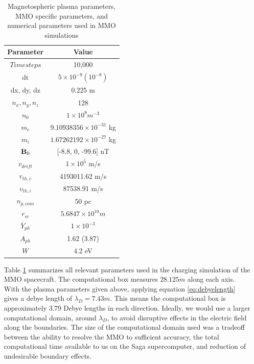 \begin{table}[H]
    \centering
    \begin{tabular}{c|c}
        \toprule
        \toprule
        Parameter & Value \\
        \midrule
        $Timesteps$ & 10,000 \\
        dt & $5 \times 10^{-9} (10^{-8})$ \\
        dx, dy, dz & 0.225 m \\
        $n_x, n_y, n_z$ & 128 \\
        $n_0$ & $1 \times 10^8 m^{-3}$ \\
        $m_e$ & $9.10938356 \times 10^{-31}$ kg\\
        $m_i$ & $1.67262192 \times 10^{-27}$ kg\\
        $\vb{B}_0$ & [-8.8, 0, -99.6] nT\\
        $v_{drift}$ & $1 \times 10^5$ m/s\\
        $v_{th,e}$ & 4193011.62 m/s\\
        $v_{th,i}$ & 87538.91 m/s\\
        $n_{p,com}$ & 50 pc\\
        $r_{sc}$ & $5.6847 \times 10^{10} m$\\
        $\overline{Y}_{ph}$ & $ 1 \times 10^{-3}$ \\
        $A_{ph}$ & 1.62 (3.87) \\
        $W$ & 4.2 eV \\
        \bottomrule
        \bottomrule
    \end{tabular}
    \caption{Magnetospheric plasma parameters, MMO specific parameters, and numerical parameters used in MMO simulations}
    \label{tab:PlasmaParamMMO}
\end{table}

Table \ref{tab:PlasmaParamMMO} summarizes all relevant parameters used in the charging simulation of the MMO spacecraft. The computational box measures $28.125 m$ along each axis. With the plasma parameters given above, applying equation \eqref{eq:debyelength} gives a debye length of $\lambda_D = 7.43 m$. This means the computational box is approximately 3.79 Debye lengths in each direction. Ideally, we would use a larger computational domain, around $\lambda_D$, to avoid disruptive effects in the electric field along the boundaries. The size of the computational domain used was a tradeoff between the ability to resolve the MMO to sufficient accuracy, the total computational time available to us on the Saga supercomputer, and reduction of undesirable boundary effects. 

